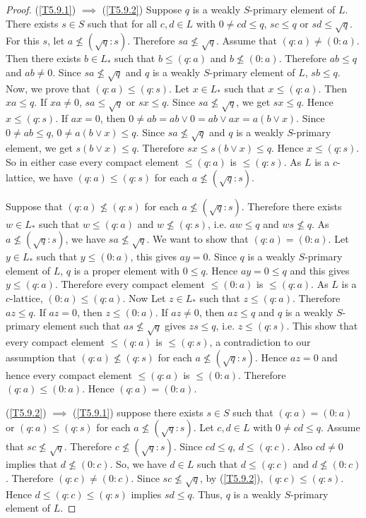 \documentclass[10pt,twoside,a4paper]{amsart}
\numberwithin{equation}{section}
\theoremstyle{plain}
\theoremstyle{definition}
\begin{document}
\begin{proof}
	(\ref{T5.9.1}) $\implies$ (\ref{T5.9.2}) Suppose $q$ is a weakly $S$-primary element of $L$. There exists $s\in S$ such that for all $c,d\in L$ with $0 \neq cd\leq q$, $sc\leq q$ or $sd\leq \sqrt{q}$. For this $s$, let $a\nleq (\sqrt{q}:s)$. Therefore $sa\nleq \sqrt{q}$. Assume that $(q:a)\neq (0:a)$. Then there exists $b\in L_*$ such that $b\leq (q:a)$ and $b\nleq (0:a)$. Therefore $ab\leq q$ and $ab\neq 0$. Since $sa\nleq \sqrt{q}$ and $q$ is a weakly $S$-primary element of $L$, $sb\leq q$. Now, we prove that  $(q:a)\leq (q:s)$.  Let $x \in L_*$ such that  $x  \leq (q:a)$. Then $xa\leq q$. If $xa\neq 0$, $sa\leq \sqrt{q}$ or $sx\leq q$. Since $sa\nleq \sqrt{q}$, we get $sx\leq q$. Hence $x\leq (q:s)$. If $ax=0$, then $0\neq ab=ab\vee 0=ab\vee ax=a(b\vee x)$. Since $0\neq ab\leq q$, $0\neq a(b\vee x)\leq q$. Since $sa\nleq \sqrt{q}$ and $q$ is a weakly $S$-primary element, we get $s(b\vee x)\leq q$. Therefore $sx\leq s(b\vee x)\leq q$. Hence $x\leq (q:s)$.  So in either case every compact element $\leq (q:a)$ is $\leq  (q:s)$. As $L$ is a $c$-lattice, we have $(q:a)\leq (q:s)$ for each $a\nleq (\sqrt{q}:s)$.
	
	Suppose that  $(q:a)\nleq (q:s)$ for each $a\nleq (\sqrt{q}:s)$. Therefore there exists $w \in L_*$ such that $w \leq (q:a)$ and $w \nleq (q:s)$, i.e. $aw \leq q$ and $ws \nleq q$. As $a\nleq (\sqrt{q}:s)$, we have $sa \nleq \sqrt{q}$. We want to show that $(q:a) =(0:a)$. Let $y \in L_*$ such that $y \leq (0:a)$, this gives $ay =0$. Since $q$ is a weakly $S$-primary element of $L$, $q$ is a proper element with $0\leq q$. Hence $ay =0 \leq q$ and this gives $y \leq (q:a)$. Therefore every compact element $\leq (0:a)$ is $\leq (q:a)$. As $L$ is a $c$-lattice, $(0:a) \leq (q:a)$. Now Let $z 	\in L_*$ such that $z \leq (q:a)$. Therefore $az \leq q$. If $az =0$, then $z \leq (0:a)$. If $az \neq 0$, then $az \leq q$  and $q$ is a weakly $S$-primary element such that $as \nleq \sqrt{q}$ gives $zs \leq q$, i.e. $z \leq (q:s)$. This show that  every compact element $\leq (q:a)$ is $\leq (q:s)$, a contradiction to our assumption that $(q:a)\nleq (q:s)$ for each $a\nleq (\sqrt{q}:s)$. Hence $az =0$ and hence every compact element $\leq (q:a)$ is $\leq (0:a)$. Therefore $(q:a) \leq (0:a)$. Hence $(q:a) = (0:a)$.
	
	(\ref{T5.9.2}) $\implies$ (\ref{T5.9.1}) suppose there exists $s\in S$ such that $(q:a)=(0:a)$ or $(q:a)\leq (q:s)$ for each $a\nleq (\sqrt{q}:s)$. Let $c,d\in L$ with $0 \neq cd \leq q$. Assume that $sc\nleq \sqrt{q}$. Therefore $c\nleq (\sqrt{q}:s)$. Since $cd\leq q$, $d\leq (q:c)$. Also $cd\neq 0$ implies that $d\nleq (0:c)$. So, we have $d\in L$ such that $d\leq (q:c)$ and $d\nleq (0:c)$. Therefore $(q:c)\neq (0:c)$. Since $sc\nleq \sqrt{q}$, by (\ref{T5.9.2}), $(q:c)\leq (q:s)$. Hence $d\leq (q:c)\leq (q:s)$ implies $sd\leq q$. Thus, $q$ is a weakly $S$-primary element of $L$.
\end{proof}
\end{document}
